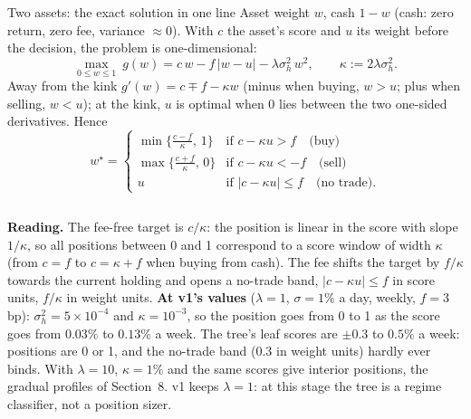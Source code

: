 \documentclass[10pt,aspectratio=169]{beamer}
\newcommand{\1}{\mathbf{1}}
\begin{document}
\begin{frame}{Two assets: the exact solution in one line}
\small
Asset weight $w$, cash $1-w$ (cash: zero return, zero fee, variance $\approx0$). With $c$ the asset's score and $u$ its weight before the decision, the problem is one-dimensional:
\[
\max_{0\le w\le1}\ g(w)=c\,w-f\,|w-u|-\lambda\sigma_h^2\,w^2,\qquad \kappa:=2\lambda\sigma_h^2 .
\]
Away from the kink $g'(w)=c\mp f-\kappa w$ (minus when buying, $w>u$; plus when selling, $w<u$); at the kink, $u$ is optimal when $0$ lies between the two one-sided derivatives. Hence
\[
w^\star=\begin{cases}
\min\big\{\frac{c-f}{\kappa},\,1\big\} & \text{if } c-\kappa u>f \quad\text{(buy)}\\[5pt]
\max\big\{\frac{c+f}{\kappa},\,0\big\} & \text{if } c-\kappa u<-f \quad\text{(sell)}\\[5pt]
u & \text{if } |c-\kappa u|\le f \quad\text{(no trade)}.
\end{cases}
\]
\begin{columns}[T]
\footnotesize
\textbf{Reading.} The fee-free target is $c/\kappa$: the position is linear in the score with slope $1/\kappa$, so all positions between 0 and 1 correspond to a score window of width $\kappa$ (from $c=f$ to $c=\kappa+f$ when buying from cash). The fee shifts the target by $f/\kappa$ towards the current holding and opens a no-trade band, $|c-\kappa u|\le f$ in score units, $f/\kappa$ in weight units.
\footnotesize
\textbf{At v1's values} ($\lambda=1$, $\sigma=1\%$ a day, weekly, $f=3$ bp): $\sigma_h^2=5\times10^{-4}$ and $\kappa=10^{-3}$, so the position goes from 0 to 1 as the score goes from $0.03\%$ to $0.13\%$ a week. The tree's leaf scores are $\pm0.3$ to $0.5\%$ a week: \alert{positions are 0 or 1}, and the no-trade band ($0.3$ in weight units) hardly ever binds. With $\lambda=10$, $\kappa=1\%$ and the same scores give interior positions, the gradual profiles of Section~8. v1 keeps $\lambda=1$: at this stage the tree is a regime classifier, not a position sizer.
\end{columns}
\end{frame}
\end{document}
